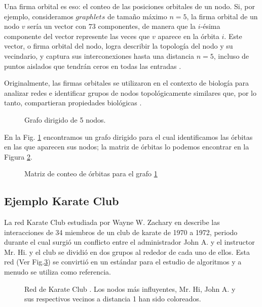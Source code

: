 Una firma orbital es eso: el conteo de las posiciones orbitales de un nodo. Si, por ejemplo, consideramos $graphlets$ de tamaño máximo $n=5$, la firma orbital de un nodo $v$ sería un vector con $73$ componentes, de manera que la $i$-ésima componente del vector represente las veces que $v$ aparece en la órbita $i$. Este vector, o firma orbital del nodo, logra describir la topología del nodo y su vecindario, y captura sus interconexiones hasta una distancia $n=5$, incluso de puntos aislados que tendrán ceros en todas las entradas \cite{sarajlic_graphlet-based_2016}.

Originalmente, las firmas orbitales se utilizaron en el contexto de biología para analizar redes e identificar grupos de nodos topológicamente similares que, por lo tanto, compartieran propiedades biológicas \cite{milenkovic_uncovering_2008}. 

 \begin{figure}[htbp]
  \centering
  
    \caption{Grafo dirigido de 5 nodos.}
    \label{fig:examplecount}
\end{figure}

En la Fig. \ref{fig:examplecount} encontramos un grafo dirigido para el cual identificamos las órbitas en las que aparecen sus nodos; la matriz de órbitas lo podemos encontrar en la Figura \ref{fig:examplecount-vector}.

 \begin{figure}[htbp]
  \centering
  
    \caption{Matriz de conteo de órbitas para el grafo \ref{fig:examplecount}}
    \label{fig:examplecount-vector}
\end{figure}

\subsection{Ejemplo Karate Club}
La red Karate Club estudiada por Wayne W. Zachary en  \cite{zachary_information_1977} describe las interacciones de 34 miembros de un club de karate de 1970 a 1972, periodo durante el cual surgió un conflicto entre el administrador John A. y el instructor Mr. Hi. y el club se dividió en dos grupos al rededor de cada uno de ellos. Esta red (Ver Fig.\ref{fig:karateclub}) se convirtió en un estándar para el estudio de algoritmos y a menudo se utiliza como referencia. 

 \begin{figure}[htbp]
  \centering
  
    \caption{Red de Karate Club \cite{zachary_information_1977}. Los nodos más influyentes, Mr. Hi, John A. y sus respectivos vecinos a distancia 1 han sido coloreados.}
    \label{fig:karateclub}
\end{figure}

